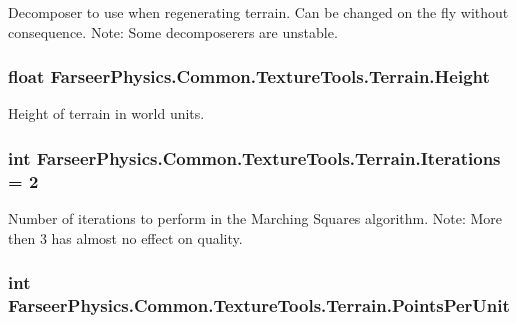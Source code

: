 Decomposer to use when regenerating terrain. Can be changed on the fly without consequence. Note\+: Some decomposerers are unstable. 

\hypertarget{class_farseer_physics_1_1_common_1_1_texture_tools_1_1_terrain_a4232983d265911c1ea4b6e243c345e07}{
\subsubsection[{Height}]{\setlength{\rightskip}{0pt plus 5cm}float Farseer\+Physics.\+Common.\+Texture\+Tools.\+Terrain.\+Height}}\label{class_farseer_physics_1_1_common_1_1_texture_tools_1_1_terrain_a4232983d265911c1ea4b6e243c345e07}


Height of terrain in world units. 

\hypertarget{class_farseer_physics_1_1_common_1_1_texture_tools_1_1_terrain_a9df7116a814bc0fc02dbdb9741ca0f5e}{
\subsubsection[{Iterations}]{\setlength{\rightskip}{0pt plus 5cm}int Farseer\+Physics.\+Common.\+Texture\+Tools.\+Terrain.\+Iterations = 2}}\label{class_farseer_physics_1_1_common_1_1_texture_tools_1_1_terrain_a9df7116a814bc0fc02dbdb9741ca0f5e}


Number of iterations to perform in the Marching Squares algorithm. Note\+: More then 3 has almost no effect on quality. 

\hypertarget{class_farseer_physics_1_1_common_1_1_texture_tools_1_1_terrain_af0f133b5819c5c2bf8526fbf643654e8}{
\subsubsection[{Points\+Per\+Unit}]{\setlength{\rightskip}{0pt plus 5cm}int Farseer\+Physics.\+Common.\+Texture\+Tools.\+Terrain.\+Points\+Per\+Unit}}\label{class_farseer_physics_1_1_common_1_1_texture_tools_1_1_terrain_af0f133b5819c5c2bf8526fbf643654e8}


